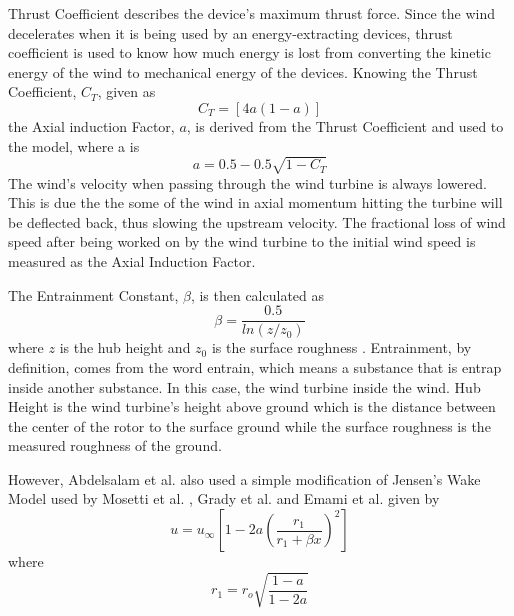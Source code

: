     Thrust Coefficient describes the device's maximum thrust force. Since the wind decelerates when it is being used by an energy-extracting devices, thrust coefficient is used to know how much energy is lost from converting the kinetic energy of the wind to mechanical energy of the devices. Knowing the Thrust Coefficient, $C_{T}$, given as
        \begin{equation}
            C_{T} = [4a(1-a)]
        \end{equation}
    the Axial induction Factor, $a$, is derived from the Thrust Coefficient and used to the model, where a is
        \begin{equation}
             a = 0.5 -0.5\sqrt{1-C_{T}}
        \end{equation}
    The wind's velocity when passing through the wind turbine is always lowered. This is due the the some of the wind in axial momentum hitting the turbine will be deflected back, thus slowing the upstream velocity. The fractional loss of wind speed after being worked on by the wind turbine to the initial wind speed is measured as the Axial Induction Factor\cite{thrust}.
    
    The Entrainment Constant, $\beta$, is then calculated as
        \begin{equation}
            \beta = \frac{0.5}{ln(z/z_{0})}
        \end{equation}
    where $z$ is the hub height and $z_{0}$ is the surface roughness \cite{book2, thrust}. Entrainment, by definition, comes from the word entrain, which means a substance that is entrap inside another substance. In this case, the wind turbine inside the wind. Hub Height is the wind turbine's height above ground which is the distance between the center of the rotor to the surface ground while the surface roughness is the measured roughness of the ground.
    
    However, Abdelsalam et al. \cite{this} also used a simple modification of Jensen's Wake Model used by Mosetti et al. \cite{windturbine5}, Grady et al. \cite{windturbine3} and Emami et al. \cite{windturbine6} given by
    \begin{equation}
        u = u_{\infty}\left[1 - 2a\left(\frac{r_{1}}{r_{1}+\beta x}\right)^2\right]
        \label{jensen}
    \end{equation}
    where
    \begin{equation}
        r_1=r_o\sqrt{\frac{1-a}{1-2a}}
    \end{equation}
    
